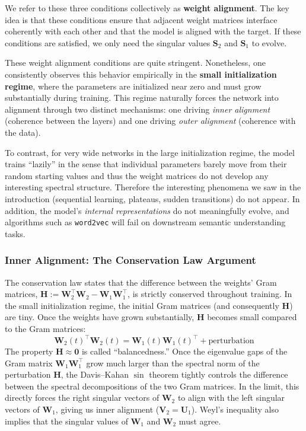 \documentclass[12pt]{article}
\newcommand{\vzero}{\mathbf{0}}
\newcommand{\mW}{\mathbf{W}}
\newcommand{\mU}{\mathbf{U}}
\newcommand{\mV}{\mathbf{V}}
\newcommand{\mS}{\mathbf{S}}
\newcommand{\mH}{\mathbf{H}}
\begin{document}
We refer to these three conditions collectively as \textbf{weight alignment}. The key idea is that these conditions ensure that adjacent weight matrices interface coherently with each other and that the model is aligned with the target. If these conditions are satisfied, we only need the singular values $\mS_2$ and $\mS_1$ to evolve.

These weight alignment conditions are quite stringent. Nonetheless, one consistently observes this behavior empirically in the \textbf{small initialization regime}, where the parameters are initialized near zero and must grow substantially during training. This regime naturally forces the network into alignment through two distinct mechanisms: one driving \emph{inner alignment} (coherence between the layers) and one driving \emph{outer alignment} (coherence with the data).

To contrast, for very wide networks in the large initialization regime, the model trains ``lazily'' in the sense that individual parameters barely move from their random starting values and thus the weight matrices do not develop any interesting spectral structure. Therefore the interesting phenomena we saw in the introduction (sequential learning, plateaus, sudden transitions) do not appear. In addition, the model's \emph{internal representations} do not meaningfully evolve, and algorithms such as \texttt{word2vec} will fail on downstream semantic understanding tasks.

\subsubsection*{Inner Alignment: The Conservation Law Argument}

The conservation law states that the difference between the weights' Gram matrices, $\mH := \mW_2^\top \mW_2 - \mW_1 \mW_1^\top$, is strictly conserved throughout training. In the small initialization regime, the initial Gram matrices (and consequently $\mH$) are tiny. Once the weights have grown substantially, $\mH$ becomes small compared to the Gram matrices:
\begin{equation}
    \mW_2(t)^\top \mW_2(t) = \mW_1(t) \mW_1(t)^\top + \text{perturbation}
\end{equation}
The property $\mH\approx\vzero$ is called ``balancedness.'' Once the eigenvalue gaps of the Gram matrix $\mW_1 \mW_1^\top$ grow much larger than the spectral norm of the perturbation $\mH$, the Davis--Kahan $\sin$ theorem tightly controls the difference between the spectral decompositions of the two Gram matrices. In the limit, this directly forces the right singular vectors of $\mW_2$ to align with the left singular vectors of $\mW_1$, giving us inner alignment ($\mV_2 = \mU_1$). Weyl's inequality also implies that the singular values of $\mW_1$ and $\mW_2$ must agree.
\end{document}
